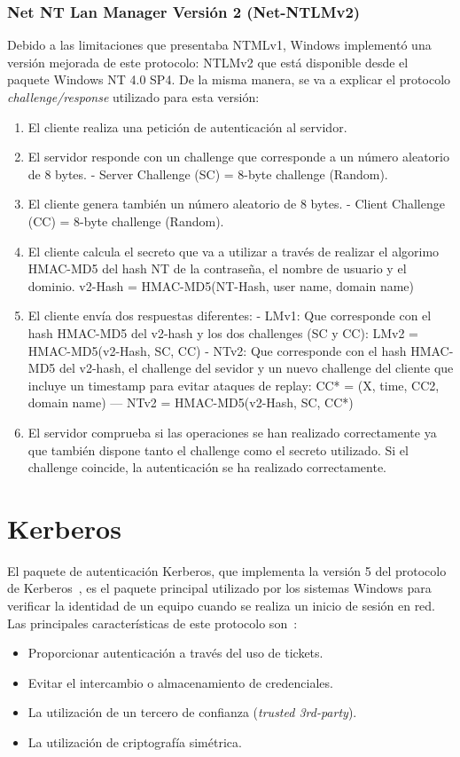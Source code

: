 \subsubsection{Net NT Lan Manager Versión 2 (Net-NTLMv2)}

Debido a las limitaciones que presentaba NTMLv1, Windows implementó una versión mejorada de este protocolo: NTLMv2 que está disponible desde el paquete Windows NT 4.0 SP4. De la misma manera, se va a explicar el protocolo {\it challenge/response} utilizado para esta versión:

\begin{enumerate}
\item El cliente realiza una petición de au\-ten\-ti\-ca\-ción al servidor. 
\item El servidor responde con un challenge que corresponde a un número aleatorio de 8 bytes.
\subitem - Server Challenge (SC) = 8-byte challenge (Random).
\item El cliente genera también un número aleatorio de 8 bytes.
\subitem - Client Challenge (CC) = 8-byte challenge (Random).
\item El cliente calcula el secreto que va a utilizar a través de realizar el algorimo HMAC-MD5 del hash NT de la contraseña, el nombre de usuario y el dominio. 
\subitem v2-Hash = HMAC-MD5(NT-Hash, user name, domain name)
\item El cliente envía dos respuestas diferentes: 
\subitem - LMv1: Que corresponde con el hash HMAC-MD5 del v2-hash y los dos challenges (SC y CC): LMv2 = HMAC-MD5(v2-Hash, SC, CC)
\subitem - NTv2: Que corresponde con el hash HMAC-MD5 del v2-hash, el challenge del sevidor y un nuevo challenge del cliente que incluye un timestamp para evitar ataques de replay: CC* = (X, time, CC2, domain name) --- NTv2 = HMAC-MD5(v2-Hash, SC, CC*)
\item El servidor comprueba si las operaciones se han realizado correctamente ya que también dispone tanto el challenge como el secreto utilizado. Si el challenge coincide, la au\-ten\-ti\-ca\-ción se ha realizado correctamente.
\end{enumerate}

\section{Kerberos}

El paquete de au\-ten\-ti\-ca\-ción Kerberos, que implementa la versión 5 del protocolo de Kerberos~\cite{Capitulo3:Kerberos}, es el paquete principal utilizado por los sistemas Windows para verificar la identidad de un equipo cuando se realiza un inicio de sesión en red. Las principales características de este protocolo son~\cite{Capitulo3:Kerberos2}: 
\begin{itemize}
\item Proporcionar au\-ten\-ti\-ca\-ción a través del uso de tickets.
\item Evitar el intercambio o almacenamiento de credenciales. 
\item La utilización de un tercero de confianza ({\it trusted 3rd-party}).
\item La utilización de criptografía simétrica. 
\end{itemize}

